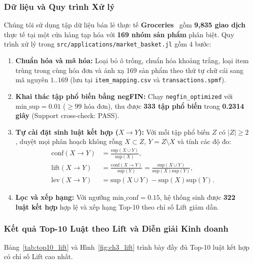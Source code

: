 \documentclass[conference]{IEEEtran}
\begin{document}
\subsubsection{Dữ liệu và Quy trình Xử lý}
Chúng tôi sử dụng tập dữ liệu bán lẻ thực tế \textbf{Groceries}~\cite{b10} gồm \textbf{9,835 giao dịch} thực tế tại một cửa hàng tạp hóa với \textbf{169 nhóm sản phẩm} phân biệt. Quy trình xử lý trong \texttt{src/applications/market\_basket.jl} gồm 4 bước:
\begin{enumerate}
    \item \textbf{Chuẩn hóa và mã hóa:} Loại bỏ ô trống, chuẩn hóa khoảng trắng, loại item trùng trong cùng hóa đơn và ánh xạ 169 sản phẩm theo thứ tự chữ cái sang mã nguyên $1..169$ (lưu tại \texttt{item\_mapping.csv} và \texttt{transactions.spmf}).
    \item \textbf{Khai thác tập phổ biến bằng negFIN:} Chạy \texttt{negfin\_optimized} với $\text{min\_sup} = 0.01$ ($\ge 99$ hóa đơn), thu được \textbf{333 tập phổ biến} trong \textbf{0.2314 giây} (Support cross-check: PASS).
    \item \textbf{Tự cài đặt sinh luật kết hợp ($X \rightarrow Y$):} Với mỗi tập phổ biến $Z$ có $|Z| \ge 2$, duyệt mọi phân hoạch không rỗng $X \subset Z$, $Y = Z \setminus X$ và tính các độ đo:
    \begin{align}
    \text{conf}(X \!\rightarrow\! Y) &= \frac{\text{sup}(X \cup Y)}{\text{sup}(X)}, \label{eq:conf} \\
    \text{lift}(X \!\rightarrow\! Y) &= \frac{\text{conf}(X \!\rightarrow\! Y)}{\text{sup}(Y)} = \frac{\text{sup}(X \cup Y)}{\text{sup}(X)\text{sup}(Y)}, \label{eq:lift} \\
    \text{lev}(X \!\rightarrow\! Y) &= \text{sup}(X \cup Y) - \text{sup}(X)\text{sup}(Y). \label{eq:lev}
    \end{align}
    \item \textbf{Lọc và xếp hạng:} Với ngưỡng $\text{min\_conf} = 0.15$, hệ thống sinh được \textbf{322 luật kết hợp} hợp lệ và xếp hạng Top-10 theo chỉ số Lift giảm dần.
\end{enumerate}

\subsubsection{Kết quả Top-10 Luật theo Lift và Diễn giải Kinh doanh}
Bảng~\ref{tab:top10_lift} và Hình~\ref{fig:ch3_lift} trình bày đầy đủ Top-10 luật kết hợp có chỉ số Lift cao nhất.
\end{document}
